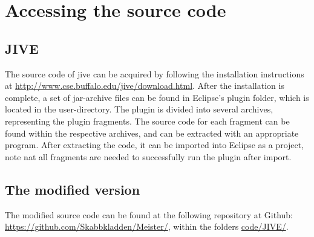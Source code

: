 \chapter{Accessing the source code}\label{appSrc}
\section{JIVE}\label{appSrcJive}
The source code of \gls{jive} can be acquired by following the installation instructions at \url{http://www.cse.buffalo.edu/jive/download.html}.
After the installation is complete, a set of jar-archive files can be found in Eclipse's plugin folder, which is located in the user-directory.
The plugin is divided into several archives, representing the plugin fragments.
The source code for each fragment can be found within the respective archives, and can be extracted with an appropriate program.
After extracting the code, it can be imported into Eclipse as a project, note nat all fragments are needed to successfully run the plugin after import.

\section{The modified version}\label{appSrcJiveMod}
The modified source code can be found at the following repository at Github: \url{https://github.com/Skabbkladden/Meister/}, within the folders \url{code/JIVE/}.